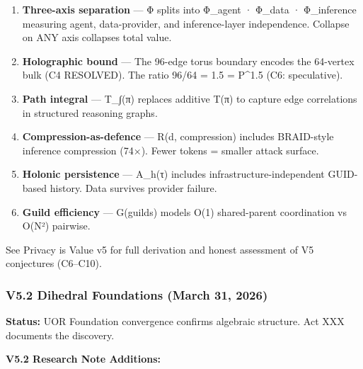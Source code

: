 \documentclass[
]{article}
\begin{document}
\begin{enumerate}
\def\labelenumi{\arabic{enumi}.}
\item
  \textbf{Three-axis separation} --- Φ splits into Φ\_agent · Φ\_data ·
  Φ\_inference measuring agent, data-provider, and inference-layer
  independence. Collapse on ANY axis collapses total value.
\item
  \textbf{Holographic bound} --- The 96-edge torus boundary encodes the
  64-vertex bulk (C4 RESOLVED). The ratio 96/64 = 1.5 = P\^{}1.5 (C6:
  speculative).
\item
  \textbf{Path integral} --- T\_∫(π) replaces additive T(π) to capture
  edge correlations in structured reasoning graphs.
\item
  \textbf{Compression-as-defence} --- R(d, compression) includes
  BRAID-style inference compression (74×). Fewer tokens = smaller attack
  surface.
\item
  \textbf{Holonic persistence} --- A\_h(τ) includes
  infrastructure-independent GUID-based history. Data survives provider
  failure.
\item
  \textbf{Guild efficiency} --- G(guilds) models O(1) shared-parent
  coordination vs O(N²) pairwise.
\end{enumerate}

See Privacy is Value v5 for full derivation and honest assessment of V5
conjectures (C6--C10).

\subsubsection{V5.2 Dihedral Foundations (March 31,
2026)}\label{v5.2-dihedral-foundations-march-31-2026}

\textbf{Status:} UOR Foundation convergence confirms algebraic
structure. Act XXX documents the discovery.

\textbf{V5.2 Research Note Additions:}
\end{document}
